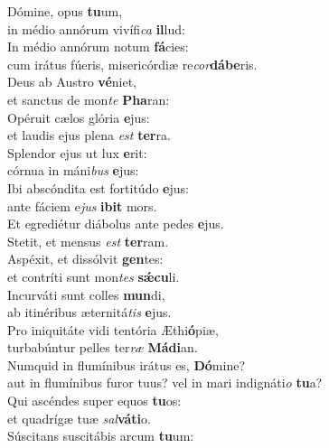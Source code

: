 \evenverse Dómine, opus \textbf{tu}um,~\*\\
\evenverse in médio annórum vivífi\textit{ca} \textbf{il}lud:\\
\oddverse In médio annórum notum \textbf{fá}cies:~\*\\
\oddverse cum irátus fúeris, misericórdiæ re\textit{cor}\textbf{dá}\textbf{be}ris.\\
\evenverse Deus ab Austro \textbf{vé}niet,~\*\\
\evenverse et sanctus de mon\textit{te} \textbf{Pha}ran:\\
\oddverse Opéruit cælos glória \textbf{e}jus:~\*\\
\oddverse et laudis ejus plena \textit{est} \textbf{ter}ra.\\
\evenverse Splendor ejus ut lux \textbf{e}rit:~\*\\
\evenverse córnua in máni\textit{bus} \textbf{e}jus:\\
\oddverse Ibi abscóndita est fortitúdo \textbf{e}jus:~\*\\
\oddverse ante fáciem e\textit{jus} \textbf{i}\textbf{bit} mors.\\
\evenverse Et egrediétur diábolus ante pedes \textbf{e}jus.~\*\\
\evenverse Stetit, et mensus \textit{est} \textbf{ter}ram.\\
\oddverse Aspéxit, et dissólvit \textbf{gen}tes:~\*\\
\oddverse et contríti sunt mon\textit{tes} \textbf{sǽ}\textbf{cu}li.\\
\evenverse Incurváti sunt colles \textbf{mun}di,~\*\\
\evenverse ab itinéribus æternitá\textit{tis} \textbf{e}jus.\\
\oddverse Pro iniquitáte vidi tentória Æthi\textbf{ó}piæ,~\*\\
\oddverse turbabúntur pelles ter\textit{ræ} \textbf{Má}\textbf{di}an.\\
\evenverse Numquid in flumínibus irátus es, \textbf{Dó}mine?~\*\\
\evenverse aut in flumínibus furor tuus? vel in mari indignáti\textit{o} \textbf{tu}a?\\
\oddverse Qui ascéndes super equos \textbf{tu}os:~\*\\
\oddverse et quadrígæ tuæ \textit{sal}\textbf{vá}\textbf{ti}o.\\
\evenverse Súscitans suscitábis arcum \textbf{tu}um:~\*\\
